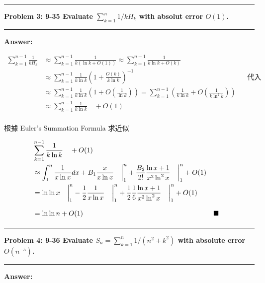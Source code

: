 \documentclass[11pt,fleqn]{article}
\newcommand\question[2]{\vspace{.25in}\hrule\textbf{#1: #2}\vspace{.5em}\hrule\vspace{.10in}}
\renewcommand\part[1]{\vspace{.10in}\textbf{#1}}
\begin{document}
\question{Problem 3} {9-35 Evaluate $\sum_{k=1}^{n} 1/k H_k$ with absolut error $O(1)$.
}

\part{Answer:}

\begin{align*}
	\sum\limits_{k=1}^{n-1} \frac{1}{k H_k} 
		&\approx \sum\limits_{k=1}^{n-1} \frac{1}{k(\ln k + O(1))} 
		 \approx \sum\limits_{k=1}^{n-1} \frac{1}{k\ln k + O(k)} \\
		&\approx \sum\limits_{k=1}^{n-1} \frac{1}{k\ln k} 
			\left(1 + \frac{O(k)}{k \ln k}\right)^{-1} && \text{代入 (9.34)}\\
		&\approx \sum\limits_{k=1}^{n-1} \frac{1}{k\ln k} 
			\left(1 + O\left(\frac{1}{\ln k}\right)\right) 
		= \sum\limits_{k=1}^{n-1} \left(\frac{1}{k\ln k} 
			+ O\left(\frac{1}{k \ln^2 k}\right)\right) \\
		&\approx \sum\limits_{k=1}^{n-1} \frac{1}{k\ln k} \quad + O(1) \\
\end{align*}

根據 Euler's Summation Formula 求近似

\begin{align*}
	&\sum\limits_{k=1}^{n-1} \frac{1}{k\ln k} \quad + O(1) \\
	&\approx \int^{n}_{1} \frac{1}{x \ln x} dx + B_1 \frac{x}{x \ln x} 
		\left.\phantom{0\over0} \right|^{n}_{1} + \frac{B_2}{2!} 
		\frac{\ln x + 1}{x^2 \ln^2 x} \left.\phantom{0\over0} \right|^{n}_{1} + O(1) \\
	&= \ln \ln x \left.\phantom{0\over0} \right|^{n}_{1} 
		- \frac{1}{2} \frac{1}{x \ln x} \left.\phantom{0\over0} \right|^{n}_{1}
		+ \frac{1}{2} \frac{1}{6} \frac{\ln x + 1}{x^2 \ln^2 x} 
			\left.\phantom{0\over0} \right|^{n}_{1} + O(1) \\
	&= \ln \ln n + O(1) \phantom{{0\over0}\over0} && \blacksquare
\end{align*}

\question{Problem 4} {9-36 Evaluate $S_n = \sum\limits_{k=1}^{n} 1 / (n^2 + k^2)$ with
	absolute error $O(n^{-5})$.
}

\part{Answer:}
\end{document}
